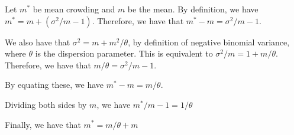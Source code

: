 Let $m^*$ be mean crowding and $m$ be the mean. By definition, we have $m^* = m +(\sigma^2/m -1)$. 
Therefore, we have that $m^*- m = \sigma^2/m -1$.

We also have that $\sigma^2 = m + m^2/\theta$, by definition of negative binomial variance, where $\theta$ is the dispersion parameter. This is equivalent to $\sigma^2/m = 1 + m/\theta$.
Therefore, we have that $m/\theta = \sigma^2/m - 1$.

By equating these, we have $m^*- m = m/\theta$. 

Dividing both sides by $m$, we have $m^*/m - 1 = 1/\theta$

Finally, we have that $m^*= m/\theta + m$
